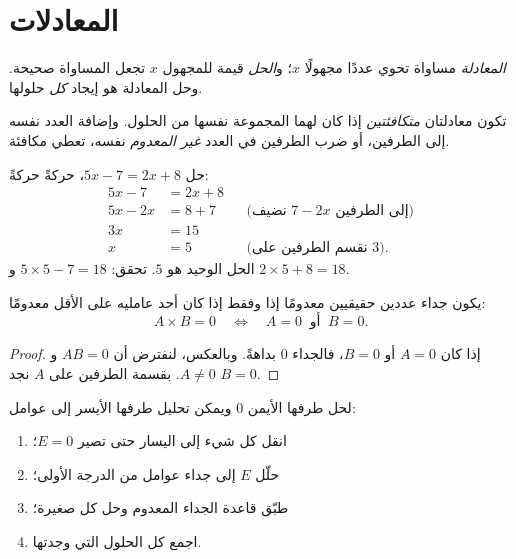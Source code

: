 \section{المعادلات}

\begin{definition}\label{def:g10:algebra:equation}
\emph{المعادلة} مساواة تحوي عددًا مجهولًا
$x$؛ و\emph{الحل} قيمة للمجهول $x$ تجعل المساواة
صحيحة. وحل المعادلة هو إيجاد \emph{كل} حلولها.
\end{definition}

تكون معادلتان \emph{متكافئتين} إذا كان لهما المجموعة نفسها من
الحلول. وإضافة العدد نفسه إلى الطرفين، أو ضرب الطرفين
في العدد \emph{غير المعدوم} نفسه، تعطي  مكافئة.

\begin{example}\label{ex:g10:algebra:firstdegree}
حل $5x - 7 = 2x + 8$، حركةً حركةً:
\begin{align*}
5x - 7 &= 2x + 8 \\
5x - 2x &= 8 + 7 && \text{(نضيف $7 - 2x$ إلى الطرفين)} \\
3x &= 15 \\
x &= 5 && \text{(نقسم الطرفين على $3$).}
\end{align*}
الحل الوحيد هو $5$. تحقق: $5 \times 5 - 7 = 18$ و
$2 \times 5 + 8 = 18$.
\end{example}

\begin{theorem}\label{thm:g10:algebra:zeroproduct}
يكون جداء عددين حقيقيين معدومًا إذا وفقط إذا كان أحد
عامليه على الأقل معدومًا:
\[
A \times B = 0
\quad\Longleftrightarrow\quad
A = 0 \ \text{ أو } \ B = 0 .
\]
\end{theorem}

\begin{proof}
إذا كان $A = 0$ أو $B = 0$، فالجداء $0$ بداهةً. وبالعكس، لنفترض أن
$AB = 0$ و $A \neq 0$. بقسمة الطرفين على $A$ نجد $B = 0$.
\end{proof}

\begin{method}\label{met:g10:algebra:zeroproduct}
لحل  طرفها الأيمن $0$ ويمكن تحليل طرفها الأيسر
إلى عوامل:
\begin{enumerate}
  \item انقل كل شيء إلى اليسار حتى تصير  $E = 0$؛
  \item حلّل $E$ إلى جداء عوامل من الدرجة الأولى؛
  \item طبّق قاعدة الجداء المعدوم وحل كل  صغيرة؛
  \item اجمع كل الحلول التي وجدتها.
\end{enumerate}
\end{method}

